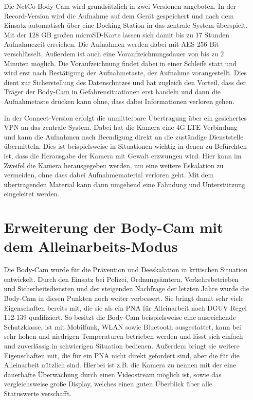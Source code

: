 \documentclass[thesis.tex]{subfiles}
\begin{document}
Die NetCo Body-Cam wird grundsätzlich in zwei Versionen angeboten.
In der Record-Version wird die Aufnahme auf dem Gerät gespeichert und nach dem Einsatz automatisch über eine Docking-Station in das zentrale System überspielt.
Mit der 128 GB großen microSD-Karte lassen sich damit bis zu 17 Stunden Aufnahmezeit erreichen.
Die Aufnahmen werden dabei mit AES 256 Bit verschlüsselt.
Außerdem ist auch eine Voraufzeichnungsdauer von bis zu 2 Minuten möglich.
Die Voraufzeichnung findet dabei in einer Schleife statt und wird erst nach Bestätigung der Aufnahmetaste, der Aufnahme vorangestellt.
Dies dient zur Sicherstellung des Datenschutzes und hat zugleich den Vorteil, dass der Träger der Body-Cam in Gefahrensituationen erst handeln und dann die Aufnahmetaste drücken kann ohne, dass dabei Informationen verloren gehen.

In der Connect-Version erfolgt die unmittelbare Übertragung über ein gesichertes VPN an das zentrale System.
Dabei hat die Kamera eine 4G LTE Verbindung und kann die Aufnahmen nach Beendigung direkt an die zuständige Dienststelle übermitteln.
Dies ist beispielsweise in Situationen wichtig in denen zu Befürchten ist, dass die Herausgabe der Kamera mit Gewalt erzwungen wird.
Hier kann im Zweifel die Kamera herausgegeben werden, um eine weitere Eskalation zu vermeiden, ohne dass dabei Aufnahmematerial verloren geht.
Mit dem übertragenden Material kann dann umgehend eine Fahndung und Unterstützung eingeleitet werden.

\section{Erweiterung der Body-Cam mit dem Alleinarbeits-Modus}

Die Body-Cam wurde für die Prävention und Deeskalation in kritischen Situation entwickelt.
Durch den Einsatz bei Polizei, Ordnungsämtern, Verkehrsbetrieben und Sicherheitsdiensten und der steigenden Nachfrage der letzten Jahre wurde die Body-Cam in diesen Punkten noch weiter verbessert.
Sie bringt damit sehr viele Eigenschaften bereits mit, die sie als ein PNA für Alleinarbeit nach DGUV Regel 112-139 \cite[]{Regel_112-139} qualifiziert.
So besitzt die Body-Cam beispielsweise eine ausreichende Schutzklasse, ist mit Mobilfunk, WLAN sowie Bluetooth ausgestattet, kann bei sehr hohen und niedrigen Temperaturen betrieben werden und lässt sich einfach und zuverlässig in schwierigen Situation bedienen.
Außerdem bringt sie weitere Eigenschaften mit, die für ein PNA nicht direkt gefordert sind, aber die für die Alleinarbeit nützlich sind.
Hierbei ist z.B. die Kamera zu nennen mit der eine dauerhafte Überwachung durch einen Videostream möglich ist, sowie das vergleichsweise große Display, welches einen guten Überblick über alle Statuswerte verschafft.
\end{document}
